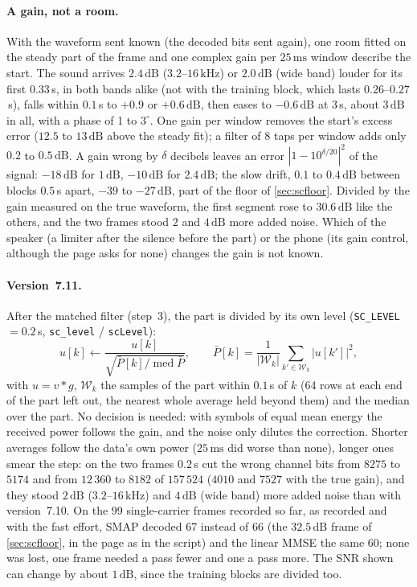 \documentclass[11pt,a4paper]{article}
\newcommand{\kHz}{\,\mathrm{kHz}}
\newcommand{\ms}{\,\mathrm{ms}}
\newcommand{\dB}{\,\mathrm{dB}}
\newcommand{\code}[1]{\texttt{#1}}
\theoremstyle{remark}
\begin{document}
\paragraph{A gain, not a room.} With the waveform sent known (the decoded bits sent again), one room fitted on the steady part of the frame and one complex gain per $25\ms$ window describe the start. The sound arrives $2.4\dB$ ($3.2$--$16\kHz$) or $2.0\dB$ (wide band) louder for its first $0.33$\,s, in both bands alike (not with the training block, which lasts $0.26$--$0.27$\,s), falls within $0.1$\,s to $+0.9$ or $+0.6\dB$, then eases to $-0.6\dB$ at $3$\,s, about $3\dB$ in all, with a phase of 1 to $3^\circ$. One gain per window removes the start's excess error ($12.5$ to $13\dB$ above the steady fit); a filter of 8 taps per window adds only $0.2$ to $0.5\dB$. A gain wrong by $\delta$ decibels leaves an error $|1 - 10^{\delta/20}|^2$ of the signal: $-18\dB$ for $1\dB$, $-10\dB$ for $2.4\dB$; the slow drift, $0.1$ to $0.4\dB$ between blocks $0.5$\,s apart, $-39$ to $-27\dB$, part of the floor of \cref{sec:scfloor}. Divided by the gain measured on the true waveform, the first segment rose to $30.6\dB$ like the others, and the two frames stood $2$ and $4\dB$ more added noise. Which of the speaker (a limiter after the silence before the part) or the phone (its gain control, although the page asks for none) changes the gain is not known.

\paragraph{Version~7.11.} After the matched filter (step~3), the part is divided by its own level (\code{SC\_LEVEL} $= 0.2$\,s, \code{sc\_level} / \code{scLevel}):
\begin{equation}
u[k] \leftarrow \frac{u[k]}{\sqrt{\bar P[k] / \operatorname{med} \bar P}}, \qquad \bar P[k] = \frac{1}{|\mathcal W_k|} \sum_{k' \in \mathcal W_k} |u[k']|^2,
\end{equation}
with $u = v * g$, $\mathcal W_k$ the samples of the part within $0.1$\,s of $k$ (64 rows at each end of the part left out, the nearest whole average held beyond them) and the median over the part. No decision is needed: with symbols of equal mean energy the received power follows the gain, and the noise only dilutes the correction. Shorter averages follow the data's own power ($25\ms$ did worse than none), longer ones smear the step: on the two frames $0.2$\,s cut the wrong channel bits from $8275$ to $5174$ and from $12\,360$ to $8182$ of $157\,524$ ($4010$ and $7527$ with the true gain), and they stood $2\dB$ ($3.2$--$16\kHz$) and $4\dB$ (wide band) more added noise than with version~7.10. On the 99 single-carrier frames recorded so far, as recorded and with the fast effort, SMAP decoded 67 instead of 66 (the $32.5\dB$ frame of \cref{sec:scfloor}, in the page as in the script) and the linear MMSE the same 60; none was lost, one frame needed a pass fewer and one a pass more. The SNR shown can change by about $1\dB$, since the training blocks are divided too.
\end{document}
